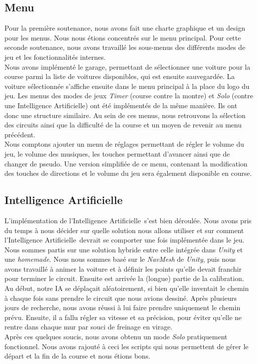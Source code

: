 \documentclass[12pt,a4paper]{article}
\newcommand{\AI}{Intelligence Artificielle}
\begin{document}
        \subsection{Menu}
            Pour la première soutenance, nous avons fait une charte graphique et un design pour les 
            menus.
            Nous nous étions concentrés sur le menu principal. Pour cette seconde soutenance, nous 
            avons travaillé les
            sous-menus des différents modes de jeu et les fonctionnalités internes.\\
            Nous avons implémenté le garage, permettant de
            sélectionner une voiture pour la course parmi la liste de voitures disponibles, qui
            est ensuite sauvegardée. La voiture sélectionnée s'affiche ensuite dans le menu principal
            à la place du logo du jeu. Les menus des modes de
            jeux \textsl{Timer} (course contre la montre) et \textsl{Solo} (contre une \AI) ont
            été implémentés de la même manière. Ils ont donc une structure similaire. Au sein de
            ces menus, nous retrouvons la sélection des circuits ainsi que la difficulté de la course et
            un moyen de revenir au menu précédent.\\
            Nous comptons ajouter un menu de réglages permettant de régler le volume du jeu, le volume
            des musiques, les touches permettant d'avancer ainsi que de changer de pseudo. Une 
            version simplifiée de ce menu, contenant la modification des touches de directions et le
            volume du jeu sera également disponible en course.

        \subsection{\AI}
            L'implémentation de l'\AI\, s'est bien déroulée. Nous avons pris du temps
            à nous décider sur quelle solution nous allons utiliser et sur comment
            l'\AI\, devrait se comporter une fois implémentée dans le jeu. Nous sommes partis sur une
            solution hybride entre celle intégrée dans \textsl{Unity} et une \textit{homemade}.
            Nous nous sommes basé sur le \textit{NavMesh} de \textsl{Unity}, puis nous avons
            travaillé à animer la voiture et à définir les points qu'elle devait franchir pour
            terminer le circuit. Ensuite est arrivée
            la (longue) partie de la calibration. Au début, notre IA se déplaçait aléatoirement,
            si bien qu'elle inventait le chemin à chaque fois sans prendre le circuit que nous
            avions dessiné. Après plusieurs jours de recherche, nous avons réussi à lui faire
            prendre uniquement le chemin prévu. Ensuite, il a fallu régler sa vitesse et sa
            précision, pour éviter qu'elle ne rentre dans chaque mur par souci de freinage en virage.\\
            Après ces quelques soucis, nous avons obtenu un mode \textsl{Solo} pratiquement
            fonctionnel. Nous avons rajouté à ceci les scripts qui nous permettent de gérer
            le départ et la fin de la course et nous étions bons.
        
\end{document}
